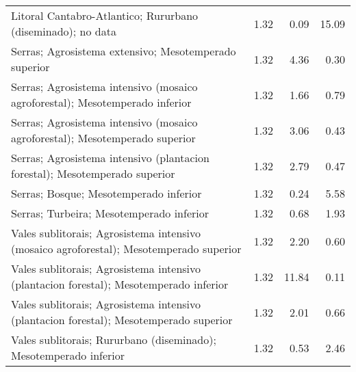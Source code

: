 \begin{table}[p]
\begin{tabular}{lrrr}
  Litoral Cantabro-Atlantico; Rururbano (diseminado); no data & 1.32 & 0.09 & 15.09 \\ 
  Serras; Agrosistema extensivo; Mesotemperado superior & 1.32 & 4.36 & 0.30 \\ 
  Serras; Agrosistema intensivo (mosaico agroforestal); Mesotemperado inferior & 1.32 & 1.66 & 0.79 \\ 
  Serras; Agrosistema intensivo (mosaico agroforestal); Mesotemperado superior & 1.32 & 3.06 & 0.43 \\ 
  Serras; Agrosistema intensivo (plantacion forestal); Mesotemperado superior & 1.32 & 2.79 & 0.47 \\ 
  Serras; Bosque; Mesotemperado inferior & 1.32 & 0.24 & 5.58 \\ 
  Serras; Turbeira; Mesotemperado inferior & 1.32 & 0.68 & 1.93 \\ 
  Vales sublitorais; Agrosistema intensivo (mosaico agroforestal); Mesotemperado superior & 1.32 & 2.20 & 0.60 \\ 
  Vales sublitorais; Agrosistema intensivo (plantacion forestal); Mesotemperado inferior & 1.32 & 11.84 & 0.11 \\ 
  Vales sublitorais; Agrosistema intensivo (plantacion forestal); Mesotemperado superior & 1.32 & 2.01 & 0.66 \\ 
  Vales sublitorais; Rururbano (diseminado); Mesotemperado inferior & 1.32 & 0.53 & 2.46 \\ 
   \hline
\end{tabular}
\end{table}
